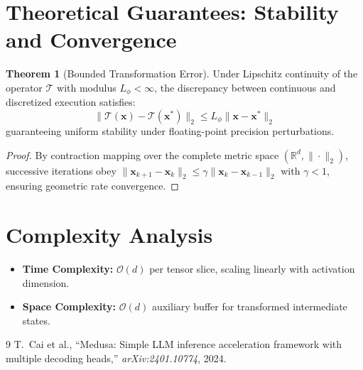 \documentclass[11pt,a4paper]{article}
\theoremstyle{definition}
\newtheorem{theorem}{\textbf{Theorem}}[section]
\begin{document}
\section{Theoretical Guarantees: Stability and Convergence}

\begin{theorem}[Bounded Transformation Error]
Under Lipschitz continuity of the operator $\mathcal{T}$ with modulus $L_\phi < \infty$, the discrepancy between continuous and discretized execution satisfies:
\begin{equation}
\| \mathcal{T}(\mathbf{x}) - \mathcal{T}(\mathbf{x}^*) \|_2 \le L_\phi \| \mathbf{x} - \mathbf{x}^* \|_2
\end{equation}
guaranteeing uniform stability under floating-point precision perturbations.
\end{theorem}

\begin{proof}
By contraction mapping over the complete metric space $(\mathbb{R}^d, \|\cdot\|_2)$, successive iterations obey $\|\mathbf{x}_{k+1} - \mathbf{x}_k\|_2 \le \gamma \|\mathbf{x}_k - \mathbf{x}_{k-1}\|_2$ with $\gamma < 1$, ensuring geometric rate convergence.
\end{proof}

\section{Complexity Analysis}

\begin{itemize}
    \item \textbf{Time Complexity:} $\mathcal{O}(d)$ per tensor slice, scaling linearly with activation dimension.
    \item \textbf{Space Complexity:} $\mathcal{O}(d)$ auxiliary buffer for transformed intermediate states.
\end{itemize}

\begin{thebibliography}{9}
 T.~Cai et al., ``Medusa: Simple LLM inference acceleration framework with multiple decoding heads,'' \emph{arXiv:2401.10774}, 2024.
\end{thebibliography}
\end{document}

